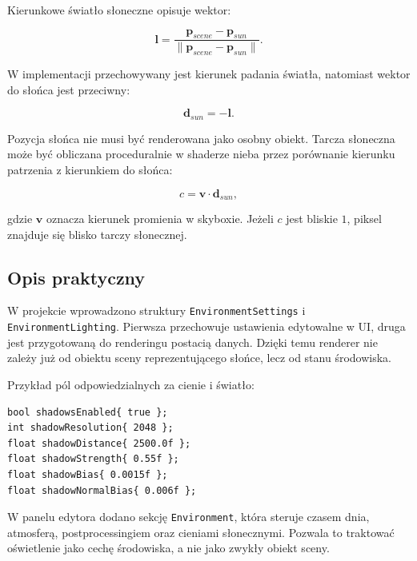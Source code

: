\documentclass[12pt,a4paper]{article}
\begin{document}
Kierunkowe światło słoneczne opisuje wektor:

\begin{equation}
    \mathbf{l} = \frac{\mathbf{p}_{scene} - \mathbf{p}_{sun}}{\|\mathbf{p}_{scene} - \mathbf{p}_{sun}\|}.
\end{equation}

W implementacji przechowywany jest kierunek padania światła, natomiast wektor do słońca jest przeciwny:

\begin{equation}
    \mathbf{d}_{sun} = -\mathbf{l}.
\end{equation}

Pozycja słońca nie musi być renderowana jako osobny obiekt. Tarcza słoneczna może być obliczana proceduralnie w shaderze nieba przez porównanie kierunku patrzenia z kierunkiem do słońca:

\begin{equation}
    c = \mathbf{v} \cdot \mathbf{d}_{sun},
\end{equation}

gdzie $\mathbf{v}$ oznacza kierunek promienia w skyboxie. Jeżeli $c$ jest bliskie $1$, piksel znajduje się blisko tarczy słonecznej.

\subsection{Opis praktyczny}

W projekcie wprowadzono struktury \texttt{EnvironmentSettings} i \texttt{EnvironmentLighting}. Pierwsza przechowuje ustawienia edytowalne w UI, druga jest przygotowaną do renderingu postacią danych. Dzięki temu renderer nie zależy już od obiektu sceny reprezentującego słońce, lecz od stanu środowiska.

Przykład pól odpowiedzialnych za cienie i światło:

\begin{lstlisting}[style=cppstyle,caption={Fragment struktury ustawień środowiska.}]
bool shadowsEnabled{ true };
int shadowResolution{ 2048 };
float shadowDistance{ 2500.0f };
float shadowStrength{ 0.55f };
float shadowBias{ 0.0015f };
float shadowNormalBias{ 0.006f };
\end{lstlisting}

W panelu edytora dodano sekcję \texttt{Environment}, która steruje czasem dnia, atmosferą, postprocessingiem oraz cieniami słonecznymi. Pozwala to traktować oświetlenie jako cechę środowiska, a nie jako zwykły obiekt sceny.
\end{document}
